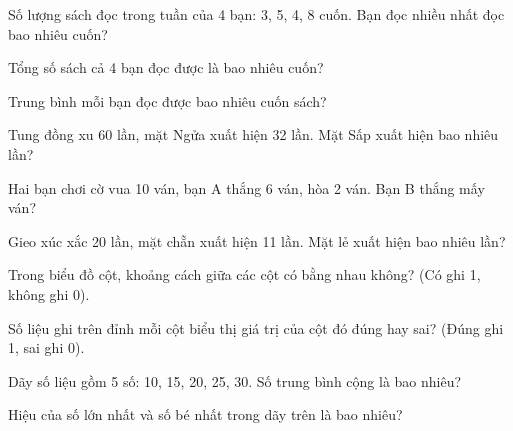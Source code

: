 \begin{ex}
Số lượng sách đọc trong tuần của 4 bạn: 3, 5, 4, 8 cuốn. Bạn đọc nhiều nhất đọc bao nhiêu cuốn?
\end{ex}

\begin{ex}
Tổng số sách cả 4 bạn đọc được là bao nhiêu cuốn?
\end{ex}

\begin{ex}
Trung bình mỗi bạn đọc được bao nhiêu cuốn sách?
\end{ex}

\begin{ex}
Tung đồng xu 60 lần, mặt Ngửa xuất hiện 32 lần. Mặt Sấp xuất hiện bao nhiêu lần?
\end{ex}

\begin{ex}
Hai bạn chơi cờ vua 10 ván, bạn A thắng 6 ván, hòa 2 ván. Bạn B thắng mấy ván?
\end{ex}

\begin{ex}
Gieo xúc xắc 20 lần, mặt chẵn xuất hiện 11 lần. Mặt lẻ xuất hiện bao nhiêu lần?
\end{ex}

\begin{ex}
Trong biểu đồ cột, khoảng cách giữa các cột có bằng nhau không? (Có ghi 1, không ghi 0).
\end{ex}

\begin{ex}
Số liệu ghi trên đỉnh mỗi cột biểu thị giá trị của cột đó đúng hay sai? (Đúng ghi 1, sai ghi 0).
\end{ex}

\begin{ex}
Dãy số liệu gồm 5 số: 10, 15, 20, 25, 30. Số trung bình cộng là bao nhiêu?
\end{ex}

\begin{ex}
Hiệu của số lớn nhất và số bé nhất trong dãy trên là bao nhiêu?
\end{ex}

